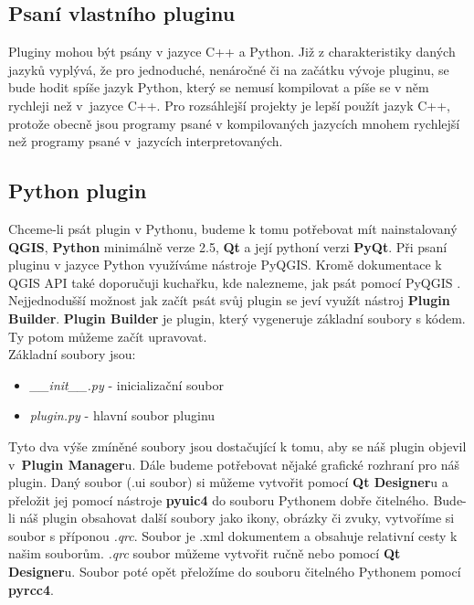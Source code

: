 \subsection{Psaní vlastního pluginu}
Pluginy mohou být psány v jazyce C++ a Python. Již z charakteristiky
daných jazyků vyplývá, že pro jednoduché, nenáročné či na začátku
vývoje pluginu, se bude hodit spíše jazyk Python, který se nemusí
kompilovat a píše se v něm rychleji než v~jazyce C++. Pro rozsáhlejší
projekty je lepší použít jazyk C++, protože obecně jsou programy psané
v kompilovaných jazycích mnohem rychlejší než programy psané
v~jazycích interpretovaných.

\subsection{Python plugin}
\nocite{pyqgis:www}
Chceme-li psát plugin v Pythonu, budeme k tomu potřebovat mít
nainstalovaný \textbf{QGIS}, \textbf{Python} minimálně verze
2.5, \textbf{Qt} a její pythoní verzi \textbf{PyQt}. Při psaní pluginu
v jazyce Python využíváme nástroje PyQGIS. Kromě dokumentace k QGIS
API \cite{qgis_api:www} také doporučuji kuchařku, kde nalezneme, jak
psát pomocí PyQGIS \cite{pyqgis:www}. Nejjednodušší možnost jak začít
psát svůj plugin se jeví využít nástroj \textbf{Plugin
Builder}. \textbf{Plugin Builder} je plugin, který vygeneruje základní
soubory s kódem. Ty potom můžeme začít upravovat. \\

\noindent Základní soubory jsou:
\begin{itemize}
	\item \textit{\_\_init\_\_.py} - inicializační soubor
	\item \textit{plugin.py} - hlavní soubor pluginu
\end{itemize}

Tyto dva výše zmíněné soubory jsou dostačující k tomu, aby se náš
plugin objevil v~\textbf{Plugin Manager}u. Dále budeme potřebovat
nějaké grafické rozhraní pro náš plugin. Daný soubor (.ui soubor) si
můžeme vytvořit pomocí \textbf{Qt Designer}u a přeložit jej pomocí
nástroje  \textbf{pyuic4} do souboru Pythonem dobře
čitelného. Bude-li náš plugin obsahovat další soubory jako ikony,
obrázky či zvuky, vytvoříme si soubor s příponou \textit{.qrc}. Soubor
je .xml dokumentem a obsahuje relativní cesty k našim
souborům. \textit{.qrc} soubor můžeme vytvořit ručně nebo
pomocí \textbf{Qt Designer}u. Soubor poté opět přeložíme do souboru
čitelného Pythonem pomocí  \textbf{pyrcc4}.

